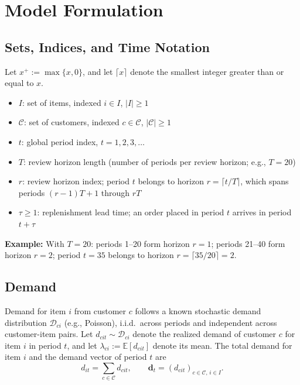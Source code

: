 \documentclass[11pt, a4paper]{article}
\theoremstyle{definition}
\theoremstyle{remark}
\begin{document}
\section{Model Formulation}

\subsection{Sets, Indices, and Time Notation}

Let $x^+ := \max\{x, 0\}$, and let $\lceil x \rceil$ denote the smallest integer greater than or equal to $x$.

\begin{itemize}
    \item $I$: set of items, indexed $i \in I$, $|I| \geq 1$
    \item $\mathcal{C}$: set of customers, indexed $c \in \mathcal{C}$, $|\mathcal{C}| \geq 1$
    \item $t$: global period index, $t = 1, 2, 3, \ldots$
    \item $T$: review horizon length (number of periods per review horizon; e.g., $T = 20$)
    \item $r$: review horizon index; period $t$ belongs to horizon $r = \lceil t/T \rceil$, which spans periods $(r-1)T+1$ through $rT$
    \item $\tau \geq 1$: replenishment lead time; an order placed in period $t$ arrives in period $t+\tau$
\end{itemize}

\textbf{Example:} With $T = 20$: periods 1--20 form horizon $r=1$; periods 21--40 form horizon $r=2$; period $t=35$ belongs to horizon $r = \lceil 35/20 \rceil = 2$.

\subsection{Demand}

Demand for item $i$ from customer $c$ follows a known stochastic demand distribution $\mathcal{D}_{ci}$ (e.g., Poisson), i.i.d.\ across periods and independent across customer-item pairs. Let $d_{cit} \sim \mathcal{D}_{ci}$ denote the realized demand of customer $c$ for item $i$ in period $t$, and let $\lambda_{ci} := \mathbb{E}[d_{cit}]$ denote its mean. The total demand for item $i$ and the demand vector of period $t$ are
\begin{equation}
    d_{it} = \sum_{c \in \mathcal{C}} d_{cit}, \qquad \mathbf{d}_t = (d_{cit})_{c \in \mathcal{C},\, i \in I}.
\end{equation}
\end{document}
